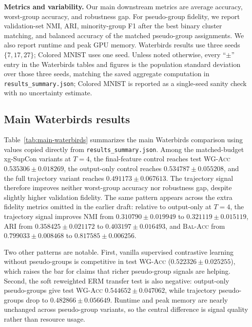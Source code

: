 \documentclass{article}
\newcommand{\wg}{\textsc{WG-Acc}}
\newcommand{\nmi}{\textsc{NMI}}
\newcommand{\ari}{\textsc{ARI}}
\newcommand{\bacc}{\textsc{Bal-Acc}}
\begin{document}
\textbf{Metrics and variability.}
Our main downstream metrics are average accuracy, worst-group accuracy, and robustness gap. For pseudo-group fidelity, we report validation-set \nmi{}, \ari{}, minority-group F1 after the best binary cluster matching, and balanced accuracy of the matched pseudo-group assignments. We also report runtime and peak GPU memory. Waterbirds results use three seeds $\{7,17,27\}$; Colored MNIST uses one seed. Unless noted otherwise, every ``$\pm$'' entry in the Waterbirds tables and figures is the population standard deviation over those three seeds, matching the saved aggregate computation in \texttt{results\_summary.json}; Colored MNIST is reported as a single-seed sanity check with no uncertainty estimate.

\subsection{Main Waterbirds results}
Table~\ref{tab:main-waterbirds} summarizes the main Waterbirds comparison using values copied directly from \texttt{results\_summary.json}. Among the matched-budget xg-SupCon variants at $T=4$, the final-feature control reaches test \wg{} $0.535306 \pm 0.018269$, the output-only control reaches $0.534787 \pm 0.055208$, and the full trajectory variant reaches $0.491173 \pm 0.067613$. The trajectory signal therefore improves neither worst-group accuracy nor robustness gap, despite slightly higher validation fidelity. The same pattern appears across the extra fidelity metrics omitted in the earlier draft: relative to output-only at $T=4$, the trajectory signal improves \nmi{} from $0.310790 \pm 0.019949$ to $0.321119 \pm 0.015119$, \ari{} from $0.358425 \pm 0.021172$ to $0.403197 \pm 0.016493$, and \bacc{} from $0.799033 \pm 0.008468$ to $0.817585 \pm 0.006256$.

Two other patterns are notable. First, vanilla supervised contrastive learning without pseudo-groups is competitive in test \wg{} ($0.522326 \pm 0.025255$), which raises the bar for claims that richer pseudo-group signals are helping. Second, the soft reweighted ERM transfer test is also negative: output-only pseudo-groups give test \wg{} $0.544652 \pm 0.047062$, while trajectory pseudo-groups drop to $0.482866 \pm 0.056649$. Runtime and peak memory are nearly unchanged across pseudo-group variants, so the central difference is signal quality rather than resource usage.
\end{document}
